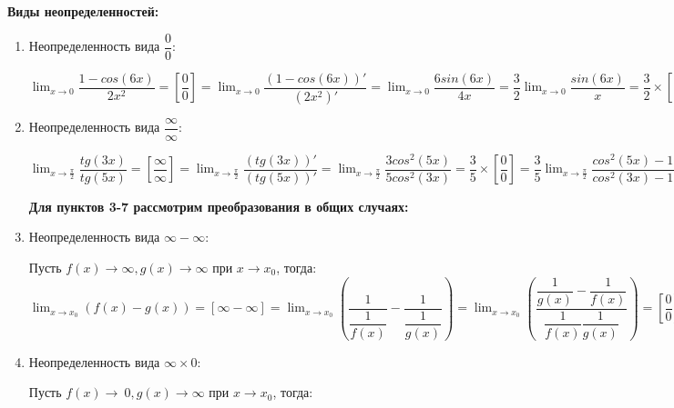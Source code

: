 \documentclass[oneside]{book}
\begin{document}
\begin{enumerate}
\begin{itemize}
\begin{enumerate}
\end{enumerate}

\textbf{Виды неопределенностей:}
\begin{enumerate}
	\item Неопределенность вида $\dfrac{0}{0}$:

	$\lim_{x \to 0} \dfrac{1-cos(6x)}{2x^{2}}=
	[\dfrac{0}{0}]=
	\lim_{x \to 0} \dfrac{(1-cos(6x))'}{(2x^{2})'}=
	\lim_{x \to 0} \dfrac{6sin(6x)}{4x}=
	\dfrac{3}{2}\lim_{x \to 0} \dfrac{sin(6x)}{x}=
	\dfrac{3}{2}\times[\dfrac{0}{0}]=
	\dfrac{3}{2}\lim_{x \to 0} \dfrac{(sin(6x))'}{(x)'}=
	\dfrac{3}{2}\lim_{x \to 0} \dfrac{6cos(6x)}{1}=
	\dfrac{3}{2}\times 6=9$

	\item Неопределенность вида $\dfrac{\infty}{\infty}$:

	$\lim_{x \to \frac{\pi}{2}} \dfrac{tg(3x)}{tg(5x)}=
	[\dfrac{\infty}{\infty}]=
	\lim_{x \to \frac{\pi}{2}} \dfrac{(tg(3x))'}{(tg(5x))'}=
	\lim_{x \to \frac{\pi}{2}}\dfrac{3cos^{2}(5x)}{5cos^{2}(3x)}=
	\dfrac{3}{5}\times[\dfrac{0}{0}]=
	\dfrac{3}{5}\lim_{x \to \frac{\pi}{2}}\dfrac{cos^{2}(5x)-1+1}{cos^{2}(3x)-1+1}=
	\dfrac{3}{5}\lim_{x \to\frac{\pi}{2}}\dfrac{cos(10x)+1}{cos(6x)+1}=
	\dfrac{3}{5}\times[\dfrac{0}{0}]=
	\dfrac{3}{5}\lim_{x \to \frac{\pi}{2}} \dfrac{(cos(10x)+1)'}{(cos(6x)+1)'}=
	\dfrac{3}{5}\lim_{x \to \frac{\pi}{2}} \dfrac{10sin(10x)}{6sin(6x)}=
	\lim_{x \to \frac{\pi}{2}} \dfrac{sin(10x)}{sin(6x)}=
	[\dfrac{0}{0}]=
	\lim_{x \to \frac{\pi}{2}} \dfrac{(sin(10x))'}{(sin(6x))'}=
	\lim_{x \to \frac{\pi}{2}} \dfrac{10cos(10x)}{6cos(6x)}=
	\dfrac{5}{3}$

	\textbf{Для пунктов 3-7 рассмотрим преобразования в общих случаях:}

	\item Неопределенность вида $\infty-\infty$:

	 Пусть $f(x)\to\infty, g(x)\to\infty$ при $x\to x_{0}$, тогда:\\

	 $\lim_{x \to x_{0}} (f(x)-g(x))=
	 [\infty-\infty]=
	 \lim_{x \to x_{0}} (\dfrac{1}{\dfrac{1}{f(x)}}-\dfrac{1}{\dfrac{1}{g(x)}})=
	 \lim_{x \to x_{0}} (\dfrac{{\dfrac{1}{g(x)}}-{\dfrac{1}{f(x)}}}{{\dfrac{1}{f(x)}}{\dfrac{1}{g(x)}}})=
	 [\dfrac{0}{0}]=...$

	\item Неопределенность вида $\infty\times 0$:

	Пусть $f(x)\to\ 0, g(x)\to\infty$ при $x\to x_{0}$, тогда:\\


\end{enumerate}
\end{itemize}
\end{enumerate}
\end{document}
